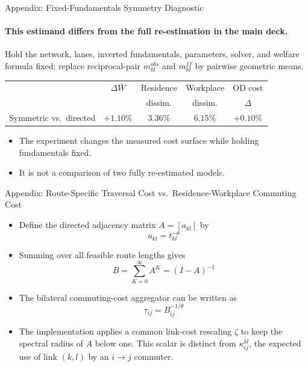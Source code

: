 \documentclass[11pt,aspectratio=169]{beamer}
\newcommand{\good}[1]{\textcolor{blue!70!black}{#1}}
\newcommand{\navback}[1]{\par\vspace{0.35em}\noindent\hfill\hyperlink{#1}{\beamerreturnbutton{back}}}
\begin{document}
\begin{frame}[label=appsymfixed]{Appendix: Fixed-Fundamentals Symmetry Diagnostic}
\framesubtitle{This estimand differs from the full re-estimation in the main deck.}
\footnotesize
Hold the network, lanes, inverted fundamentals, parameters, solver, and welfare formula fixed; replace reciprocal-pair $m_{kl}^{obs}$ and $m_{kl}^{ff}$ by pairwise geometric means.
\vspace{0.45em}
\begin{center}
\scriptsize
\begin{tabular}{lcccc}
\toprule
 & $\Delta\bar W$ & Residence & Workplace & OD cost \\
 &  & dissim. & dissim. & $\Delta$ \\
\midrule
Symmetric vs.\ directed & \good{$+1.10\%$} & $3.36\%$ & $6.15\%$ & $+0.10\%$ \\
\bottomrule
\end{tabular}
\end{center}
\vspace{0.35em}
\begin{itemize}\footnotesize
  \item The experiment changes the measured cost surface while holding fundamentals fixed.
  \item It is not a comparison of two fully re-estimated models.
\end{itemize}
\end{frame}

\begin{frame}[label=approute]{Appendix: Route-Specific Traversal Cost vs.\ Residence-Workplace Commuting Cost}
\begin{itemize}\small
  \item Define the directed adjacency matrix $A=[a_{kl}]$ by
  \vspace{-0.5em}\begin{equation}
    a_{kl} = t_{kl}^{-\theta}
  \end{equation}
  \item Summing over all feasible route lengths gives
  \vspace{-0.5em}\begin{equation}
    B = \sum_{K=0}^{\infty}A^K = (I-A)^{-1}
  \end{equation}
  \item The bilateral commuting-cost aggregator can be written as
  \vspace{-0.5em}\begin{equation}\label{eq:inverse_app}
    \tau_{ij} = B_{ij}^{-1/\theta}
  \end{equation}
  \vspace{-0.5em}
  \item The implementation applies a common link-cost rescaling $\zeta$ to keep the spectral radius of $A$ below one. This scalar is distinct from $\kappa_{ij}^{kl}$, the expected use of link $(k,l)$ by an $i\to j$ commuter.
\end{itemize}
\navback{bilateral}
\end{frame}
\end{document}
